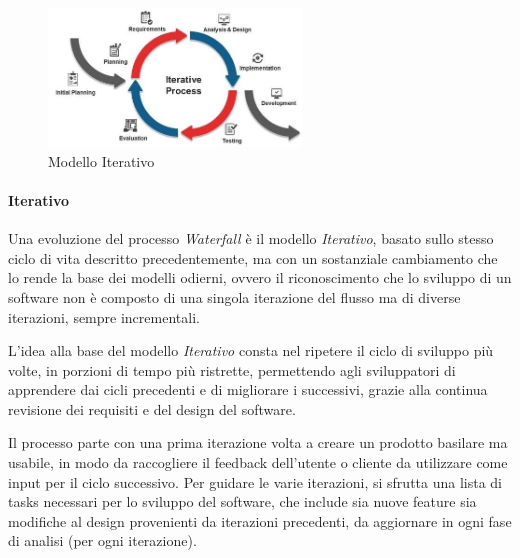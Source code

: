 \documentclass[a4paper,12pt]{report}
\begin{document}
				\begin{figure}[h]
					\centering
					\includegraphics[width=0.6\textwidth]{iterative}
					\caption{Modello Iterativo}
					\label{fig:iterative}
				\end{figure}
	
				\paragraph{Iterativo}
				Una evoluzione del processo \emph{Waterfall} è il modello \emph{Iterativo}, basato sullo stesso ciclo di vita descritto precedentemente, ma con un sostanziale cambiamento che lo rende la base dei modelli odierni, ovvero il riconoscimento che lo sviluppo di un software non è composto di una singola iterazione del flusso ma di diverse iterazioni, sempre incrementali.
				
				\vspace{3mm}
				L'idea alla base del modello \emph{Iterativo} consta nel ripetere il ciclo di sviluppo più volte, in porzioni di tempo più ristrette, permettendo agli sviluppatori di apprendere dai cicli precedenti e di migliorare i successivi, grazie alla continua revisione dei requisiti e del design del software.
				
				\vspace{3mm}
				Il processo parte con una prima iterazione volta a creare un prodotto basilare ma usabile, in modo da raccogliere il feedback dell'utente o cliente da utilizzare come input per il ciclo successivo. Per guidare le varie iterazioni, si sfrutta una lista di tasks necessari per lo sviluppo del software, che include sia nuove feature sia modifiche al design provenienti da iterazioni precedenti, da aggiornare in ogni fase di analisi (per ogni iterazione).
				
\end{document}
